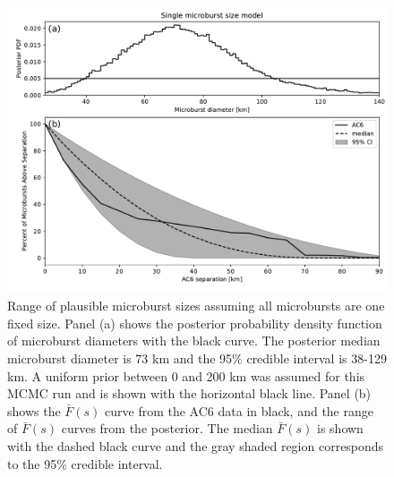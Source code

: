 \documentclass[draft]{agujournal2019}
\begin{document}
\begin{figure}
\includegraphics[width=\textwidth]{fig6.pdf}
\caption{Range of plausible microburst sizes assuming all microbursts are one fixed size. Panel (a) shows the posterior probability density function of microburst diameters with the black curve. The posterior median microburst diameter is 73 km and the 95\% credible interval is 38-129 km. A uniform prior between 0 and 200 km was assumed for this MCMC run and is shown with the horizontal black line. Panel (b) shows the $\bar{F}(s)$ curve from the AC6 data in black, and the range of $\bar{F}(s)$ curves from the posterior. The median $\bar{F}(s)$ is shown with the dashed black curve and the gray shaded region corresponds to the 95\% credible interval.} 
\label{fig6}
\end{figure}
\end{document}
